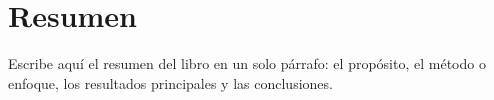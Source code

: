 
\chapter{Resumen}

\noindent Escribe aquí el resumen del libro en un solo párrafo: el propósito, el método o enfoque, los resultados principales y las conclusiones. \lipsum[1][1-8]

